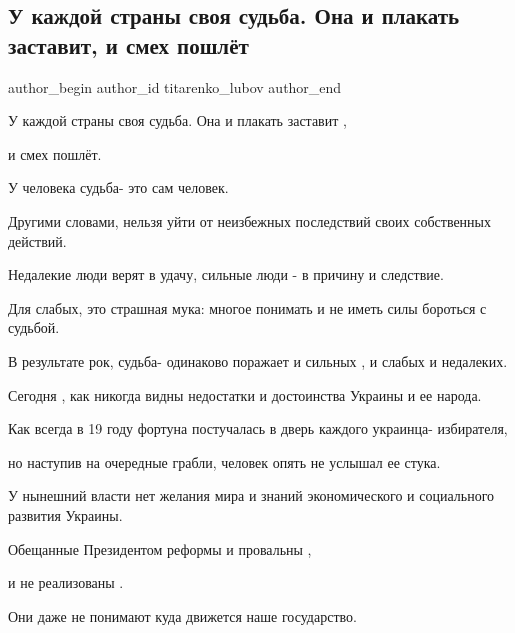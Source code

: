  
 
 
 
 
 
\subsection{У каждой страны своя судьба. Она и плакать заставит, и смех пошлёт}
\label{sec:06_10_2021.fb.titarenko_lubov.1.strana_sudjba}
 
\ifcmt
 author_begin
   author_id titarenko_lubov
 author_end
\fi

У каждой страны своя судьба. Она и плакать заставит , 

и смех пошлёт. 

У человека судьба- это сам человек.

Другими словами, нельзя уйти от неизбежных последствий своих  собственных
действий.

Недалекие люди верят в удачу, сильные люди - в причину и следствие.

	Для слабых, это страшная мука: многое понимать и не иметь силы бороться с
	судьбой.

В результате  рок, судьба- одинаково  поражает и сильных , и слабых и
недалеких. 

Сегодня , как никогда видны недостатки и достоинства Украины и ее народа. 

Как всегда  в 19 году фортуна  постучалась в дверь каждого украинца-
избирателя,

но наступив на очередные грабли,  человек опять не услышал ее стука.

У нынешний власти нет желания  мира и знаний экономического и социального
развития Украины. 

Обещанные Президентом реформы и провальны , 

и не реализованы . 

Они даже не понимают куда движется наше государство.

